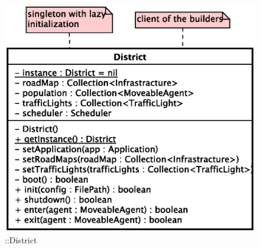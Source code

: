 \begin{figure}[h]
\centering
\includegraphics[scale=0.6,keepaspectratio]{images/solution/app/backend/district.eps}
\caption{\pReactive::District}
\label{fig:sd-app-district}
\end{figure}
\FloatBarrier
